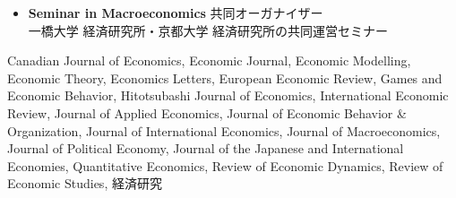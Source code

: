 \documentclass[11pt,a4paper]{article}
\newcommand{\entrytitle}[1]{{\bfseries\color{darknavy}#1}}
\begin{document}
\vspace{6pt}
\begin{itemize}[leftmargin=*, itemsep=4pt]
    \item \textbf{Seminar in Macroeconomics} 共同オーガナイザー\\
    {\small 一橋大学 経済研究所・京都大学 経済研究所の共同運営セミナー}
\end{itemize}

\noindent\entrytitle{学術誌レフェリー}

\vspace{6pt}
\noindent
Canadian Journal of Economics,
Economic Journal,
Economic Modelling,
Economic Theory,
Economics Letters,
European Economic Review,
Games and Economic Behavior,
Hitotsubashi Journal of Economics,
International Economic Review,
Journal of Applied Economics,
Journal of Economic Behavior \& Organization,
Journal of International Economics,
Journal of Macroeconomics,
Journal of Political Economy,
Journal of the Japanese and International Economies,
Quantitative Economics,
Review of Economic Dynamics,
Review of Economic Studies,
経済研究
\end{document}
